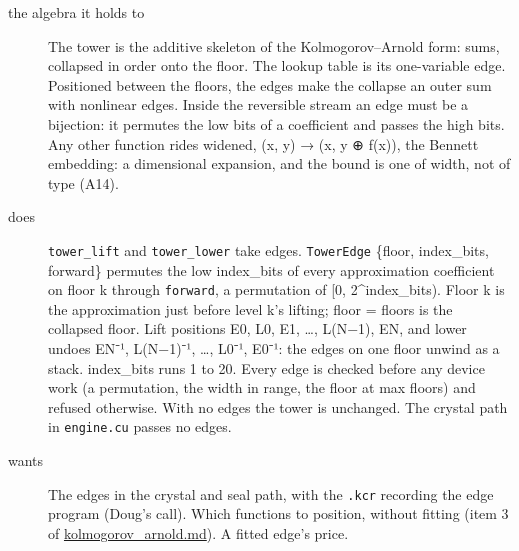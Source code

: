 \begin{description}
\item[{the algebra it holds to}] The tower is the additive skeleton of the Kolmogorov–Arnold form: sums, collapsed in order onto the floor. The lookup table is its one-variable edge. Positioned between the floors, the edges make the collapse an outer sum with nonlinear edges. Inside the reversible stream an edge must be a bijection: it permutes the low bits of a coefficient and passes the high bits. Any other function rides widened, (x, y) → (x, y ⊕ f(x)), the Bennett embedding: a dimensional expansion, and the bound is one of width, not of type (A14).
\item[{does}] \texttt{tower\_\allowbreak{}lift} and \texttt{tower\_\allowbreak{}lower} take edges. \texttt{Tower\allowbreak{}Edge} \{floor, index\_\allowbreak{}bits, forward\} permutes the low index\_\allowbreak{}bits of every approximation coefficient on floor k through \texttt{forward}, a permutation of [0, 2\textasciicircum{}index\_\allowbreak{}bits). Floor k is the approximation just before level k's lifting; floor = floors is the collapsed floor. Lift positions E0, L0, E1, …, L(N−1), EN, and lower undoes EN⁻¹, L(N−1)⁻¹, …, L0⁻¹, E0⁻¹: the edges on one floor unwind as a stack. index\_\allowbreak{}bits runs 1 to 20. Every edge is checked before any device work (a permutation, the width in range, the floor at max floors) and refused otherwise. With no edges the tower is unchanged. The crystal path in \texttt{engine.\allowbreak{}cu} passes no edges.
\item[{wants}] The edges in the crystal and seal path, with the \texttt{.\allowbreak{}kcr} recording the edge program (Doug's call). Which functions to position, without fitting (item 3 of \hyperref[chap:kolmogorov-arnold]{kolmogorov\_\allowbreak{}arnold.md}). A fitted edge's price.

\end{description}
